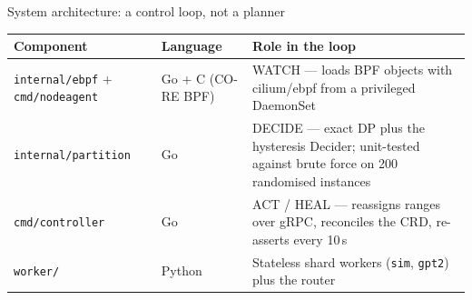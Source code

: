 \documentclass[aspectratio=169,9pt]{beamer}
\begin{document}
\begin{frame}[shrink=25]{System architecture: a control loop, not a planner}
  \vspace{1.2em}
  \raggedright\scriptsize
  \begin{tabularx}{\textwidth}{@{}p{4.0cm} p{2.2cm} X@{}}
    \toprule
    \color{keNavy}\bfseries Component & \color{keNavy}\bfseries Language &
    \color{keNavy}\bfseries Role in the loop \\
    \midrule
    \texttt{internal/ebpf} + \texttt{cmd/nodeagent} & Go + C (CO-RE BPF) &
      WATCH --- loads BPF objects with cilium/ebpf from a privileged DaemonSet \\
    \texttt{internal/partition} & Go &
      DECIDE --- exact DP plus the hysteresis Decider; unit-tested against
      brute force on 200 randomised instances \\
    \texttt{cmd/controller} & Go &
      ACT / HEAL --- reassigns ranges over gRPC, reconciles the CRD,
      re-asserts every 10\,s \\
    \texttt{worker/} & Python &
      Stateless shard workers (\texttt{sim}, \texttt{gpt2}) plus the router \\
    \bottomrule
  \end{tabularx}
\end{frame}
\end{document}
